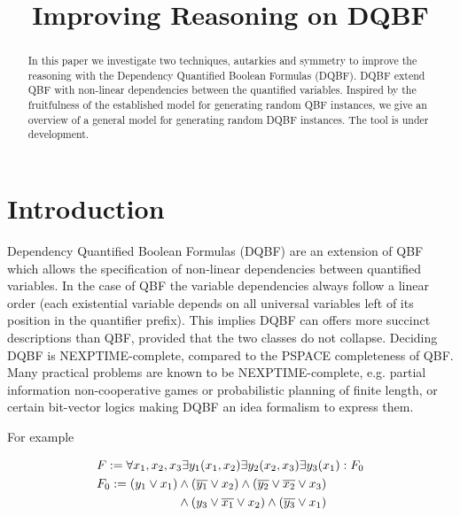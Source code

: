 \documentclass[conference]{IEEEtran}
\begin{document}
\title{Improving Reasoning on DQBF}


\author{
}

\maketitle

\begin{abstract}
In this paper we investigate two techniques, autarkies and symmetry to improve the reasoning with the Dependency Quantified Boolean Formulas (DQBF).
%
DQBF extend QBF with non-linear dependencies between the quantified variables.
%
Inspired by the fruitfulness of the established model for generating
random QBF instances, we give an overview of a general model for generating random DQBF instances.	
%
The tool is under development. 
%    
\end{abstract}



\section{Introduction}
\label{sec:Intro}
Dependency Quantified Boolean Formulas (DQBF) are an extension of QBF
which allows the specification of non-linear dependencies between quantified variables. 
%
In the case of QBF the variable dependencies always follow a
linear order (each existential variable depends on all universal variables left of its position in the quantifier prefix).
%
This implies DQBF can offers more succinct descriptions than
QBF, provided that the two classes do not collapse.
%
Deciding DQBF is NEXPTIME-complete, compared to the PSPACE completeness of QBF.
%
Many practical problems are known to be NEXPTIME-complete, e.g. partial information non-cooperative games or probabilistic planning of finite length, or certain bit-vector logics making DQBF an idea formalism to express them.

For example \par\noindent
%
\begin{equation}
\begin{split}
&F := \forall x_1,x_2,x_3 \exists y_1(x_1,x_2) \exists y_2(x_2,x_3) \exists y_3(x_1): F_0 \\
&F_0 := (y_1 \vee x_1) \wedge (\overline{y_1} \vee x_2) \wedge (\overline{y_2} \vee \overline{x_2} \vee x_3) \\
&\hspace{2.3cm}\wedge (y_3 \vee \overline{x_1} \vee x_2) \wedge (\overline{y_3} \vee x_1)
\end{split}
\label{eqn:ex}
\end{equation}
\end{document}
